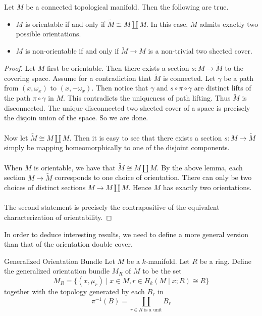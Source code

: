 \documentclass[a4paper]{article}
\begin{document}
\begin{thm}{}{} Let $M$ be a connected topological manifold. Then the following are true. 
\begin{itemize}
\item $M$ is orientable if and only if $\widetilde{M}\cong M\amalg M$. In this case, $M$ admits exactly two possible orientations. 
\item $M$ is non-orientable if and only if $\widetilde{M}\to M$ is a non-trivial two sheeted cover. 
\end{itemize} \tcbline
\begin{proof}
Let $M$ first be orientable. Then there exists a section $s:M\to\widetilde{M}$ to the covering space. Assume for a contradiction that $\widetilde{M}$ is connected. Let $\gamma$ be a path from $(x,\omega_x)$ to $(x,-\omega_x)$. Then notice that $\gamma$ and $s\circ\pi\circ\gamma$ are distinct lifts of the path $\pi\circ\gamma$ in $M$. This contradicts the uniqueness of path lifting. Thus $\widetilde{M}$ is disconnected. The unique disconnected two sheeted cover of a space is precisely the disjoin union of the space. So we are done. \\~\\

Now let $\widetilde{M}\cong M\amalg M$. Then it is easy to see that there exists a section $s:M\to\widetilde{M}$ simply be mapping homeomorphically to one of the disjoint components. \\~\\

When $M$ is orientable, we have that $\widetilde{M}\cong M\amalg M$. By the above lemma, each section $M\to\widetilde{M}$ corresponds to one choice of orientation. There can only be two choices of distinct sections $M\to M\amalg M$. Hence $M$ has exactly two orientations. \\~\\

The second statement is precisely the contrapositive of the equivalent characterization of orientability. 
\end{proof}
\end{thm}

In order to deduce interesting results, we need to define a more general version than that of the orientation double cover. 

\begin{defn}{Generalized Orientation Bundle}{} Let $M$ be a $k$-manifold. Let $R$ be a ring. Define the generalized orientation bundle $M_R$ of $M$ to be the set $$M_R=\{(x,\mu_r)\;|\;x\in M, r\in H_k(M\;|\; x;R)\cong R\}$$ together with the topology generated by each $B_r$ in $$\pi^{-1}(B)=\coprod_{r\in R\text{ is a unit}}B_r$$
\end{defn}
\end{document}
